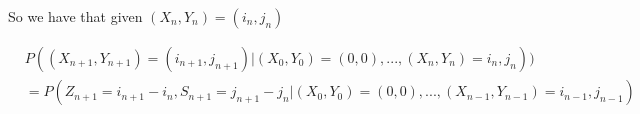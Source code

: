 So we have that given $(X_n,Y_n)=(i_n,j_n)$ 

\begin{align*}
&P((X_{n+1},Y_{n+1}) =(i_{n+1},j_{n+1})| (X_0,Y_0)=(0,0),...,(X_n,Y_n)=i_n,j_n)) \\&= P(Z_{n+1}=i_{n+1}-i_n,S_{n+1}=j_{n+1}-j_{n} | (X_0,Y_0)=(0,0),...,(X_{n-1},Y_{n-1})=i_{n-1},j_{n-1}) \\

\end{align*}